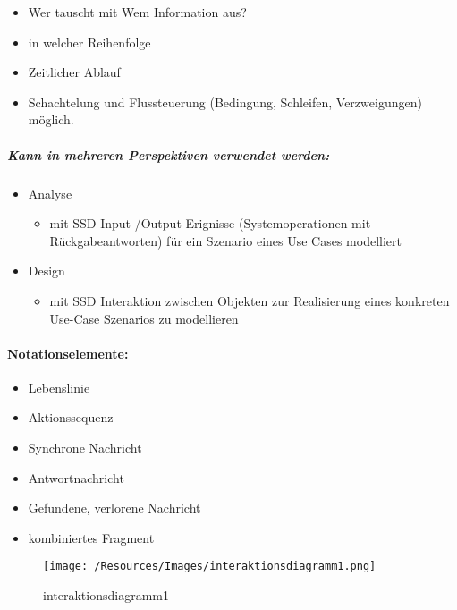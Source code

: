 \documentclass[../ZF_SWEN1.tex]{subfiles}
\begin{document}
\begin{itemize}
	\item Wer tauscht mit Wem Information aus?
	\item in welcher Reihenfolge
	\item Zeitlicher Ablauf
	\item Schachtelung und Flussteuerung (Bedingung, Schleifen, Verzweigungen) möglich.
\end{itemize}

\subparagraph{\textcolor {WildStrawberry}{\textbf{Kann in mehreren Perspektiven verwendet werden:}}}
\begin{itemize}
	\item \textcolor {Periwinkle}{Analyse}
	\begin{itemize}
		\item mit SSD Input-/Output-Erignisse (Systemoperationen mit Rückgabeantworten) für ein Szenario eines Use Cases modelliert
	\end{itemize}
	\item \textcolor {Periwinkle}{Design}
	\begin{itemize}
		\item mit SSD Interaktion zwischen Objekten zur Realisierung eines konkreten Use-Case Szenarios zu modellieren
	\end{itemize}
\end{itemize}

\paragraph{Notationselemente:}
\begin{itemize}
	\item Lebenslinie
	\item Aktionssequenz
	\item Synchrone Nachricht
	\item Antwortnachricht
	\item Gefundene, verlorene Nachricht
	\item kombiniertes Fragment
\end{itemize}

\begin{figure}[H]
\centering
\texttt{[image: /Resources/Images/interaktionsdiagramm1.png]}
\caption{\label{fig:interaktionsdiagramm1}interaktionsdiagramm1}
\end{figure}
\end{document}
